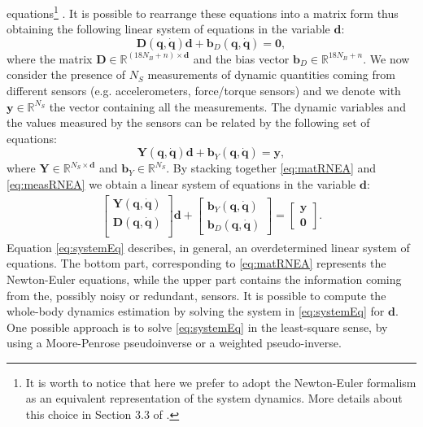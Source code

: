  equations\footnote{It is worth to notice that here we prefer to adopt the Newton-Euler
  formalism as an equivalent representation of the system dynamics. More details about 
  this choice in Section 3.3 of \cite{LatellaSensors2016}.} \cite{Featherstone2008}.  
  It is possible to rearrange these equations
  into a matrix form thus obtaining the following linear system of equations in the variable
    $\bm d$:
%
\begin{equation} \label{eq:matRNEA} 
\bm D(\bm q, \dot {\bm q}) \bm d + \bm b_D 
(\bm q,\bm {\dot q})= \bm 0,
\end{equation}
where the matrix $\bm D \in \mathbb R^{(18 N_B+n) \times \bm d}$  and the bias vector
$\bm b_D \in \mathbb R^{18 N_B+n}$.  We now consider the presence of $N_S$ measurements of dynamic quantities coming from different
 sensors (e.g. accelerometers, force/torque sensors) and we denote with $\bm y \in \mathbb
  R^{N_S}$ the vector containing all the measurements.  The dynamic variables and the values
   measured by the sensors can be related by the following set of equations:
%
\begin{equation} \label{eq:measRNEA} 
\bm Y(\bm q, \dot {\bm q}) \bm d + \bm b_Y (\bm q,\bm {\dot q})= \bm y,
\end{equation}
where $\bm Y \in \mathbb R^{N_S \times \bm d}$ and $\bm b_Y \in \mathbb R^{N_S}$.  By stacking
 together \eqref{eq:matRNEA} and \eqref{eq:measRNEA} we obtain a linear system of
  equations in the variable $\bm d$:
%
\begin{eqnarray} \label{eq:systemEq} 
\begin{bmatrix}
\bm Y(\bm q,\dot {\bm q}) \\ \bm D(\bm q, \dot {\bm q}) \\
 \end{bmatrix}\bm d + \begin{bmatrix} \bm b_Y(\bm q, \dot {\bm q})
\\ \bm b_D(\bm q, \dot {\bm q}) \end{bmatrix} = \begin{bmatrix} \bm y\\
 \bm 0 \end{bmatrix}. 
\end{eqnarray}
%
\indent
Equation \eqref{eq:systemEq} describes, in general, an overdetermined linear system of
 equations.  The bottom part, corresponding to \eqref{eq:matRNEA} represents the
  Newton-Euler equations, while the upper part contains the information coming from the,
   possibly noisy or redundant, sensors.
It is possible to compute the whole-body dynamics estimation
by solving the system in \eqref{eq:systemEq} for $\bm d$.  One possible approach is to solve \eqref{eq:systemEq} in the
 least-square sense, by using a Moore-Penrose pseudoinverse or a weighted pseudo-inverse.  
 
